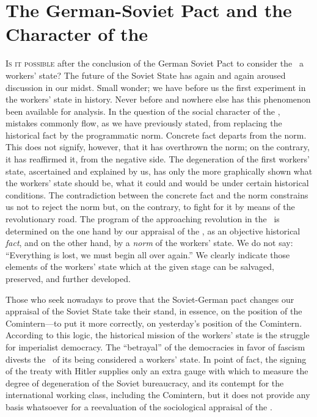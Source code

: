 
\section*{The German-Soviet Pact and the Character of the \USSR}

\textsc{Is it possible} after the conclusion of the German Soviet Pact to consider the \USSR\ a workers’ state? The future of the Soviet State has again and again aroused discussion in our midst. Small wonder; we have before us the first experiment in the workers’ state in history. Never before and nowhere else has this phenomenon been available for analysis. In the question of the social character of the \USSR, mistakes commonly flow, as we have previously stated, from replacing the historical fact by the programmatic norm. Concrete fact departs from the norm. This does not signify, however, that it has overthrown the norm; on the contrary, it has reaffirmed it, from the negative side. The degeneration of the first workers’ state, ascertained and explained by us, has only the more graphically shown what the workers’ state should be, what it could and would be under certain historical conditions. The contradiction between the concrete fact and the norm constrains us not to reject the norm but, on the contrary, to fight for it by means of the revolutionary road. The program of the approaching revolution in the \USSR\ is determined on the one hand by our appraisal of the \USSR, as an objective historical \emph{fact}, and on the other hand, by a \emph{norm} of the workers’ state. We do not say: “Everything is lost, we must begin all over again.” We clearly indicate those elements of the workers’ state which at the given stage can be salvaged, preserved, and further developed.

Those who seek nowadays to prove that the Soviet-German pact chan\-ges our appraisal of the Soviet State take their stand, in essence, on the position of the Comintern---to put it more correctly, on yesterday’s position of the Comintern. According to this logic, the historical mission of the workers’ state is the struggle for imperialist democracy. The “betrayal” of the democracies in favor of fascism divests the \USSR\ of its being considered a workers’ state. In point of fact, the signing of the treaty with Hitler supplies only an extra gauge with which to measure the degree of degeneration of the Soviet bureaucracy, and its contempt for the international working class, including the Comintern, but it does not provide any basis whatsoever for a reevaluation of the sociological appraisal of the \USSR.

